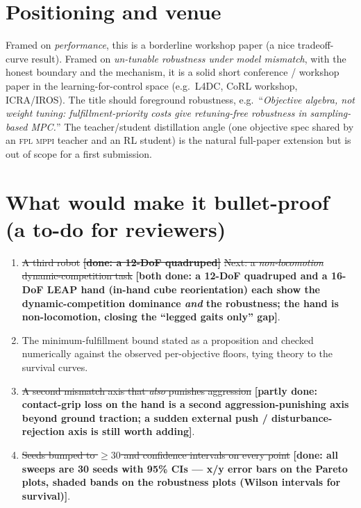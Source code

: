 \documentclass[11pt]{article}
\newcommand{\fpl}{\textsc{fpl}}
\newcommand{\mppi}{\textsc{mppi}}
\begin{document}
\section{Positioning and venue}

Framed on \emph{performance}, this is a borderline workshop paper (a nice tradeoff-curve
result). Framed on \emph{un-tunable robustness under model mismatch}, with the honest boundary
and the mechanism, it is a solid short conference / workshop paper in the learning-for-control
space (e.g.\ L4DC, CoRL workshop, ICRA/IROS). The title should foreground robustness, e.g.\
``\emph{Objective algebra, not weight tuning: fulfillment-priority costs give retuning-free
robustness in sampling-based MPC.}'' The teacher/student distillation angle (one objective
spec shared by an \fpl{} \mppi{} teacher and an RL student) is the natural full-paper extension
but is out of scope for a first submission.

\section{What would make it bullet-proof (a to-do for reviewers)}

\begin{enumerate}[leftmargin=1.4em,itemsep=2pt]
\item \sout{A third robot} \sout{\textbf{[done: a 12-DoF quadruped]}} \sout{Next: a
      \emph{non-locomotion} dynamic-competition task} \textbf{[both done: a 12-DoF quadruped and a
      16-DoF LEAP hand (in-hand cube reorientation) each show the dynamic-competition dominance
      \emph{and} the robustness; the hand is non-locomotion, closing the ``legged gaits only''
      gap]}.
\item The minimum-fulfillment bound stated as a proposition and checked numerically against the
      observed per-objective floors, tying theory to the survival curves.
\item \sout{A second mismatch axis that \emph{also} punishes aggression} \textbf{[partly done:
      contact-grip loss on the hand is a second aggression-punishing axis beyond ground traction;
      a sudden external push / disturbance-rejection axis is still worth adding]}.
\item \sout{Seeds bumped to $\ge 30$ and confidence intervals on every point}
      \textbf{[done: all sweeps are 30 seeds with 95\% CIs — x/y error bars on the Pareto
      plots, shaded bands on the robustness plots (Wilson intervals for survival)]}.
\end{enumerate}
\end{document}
